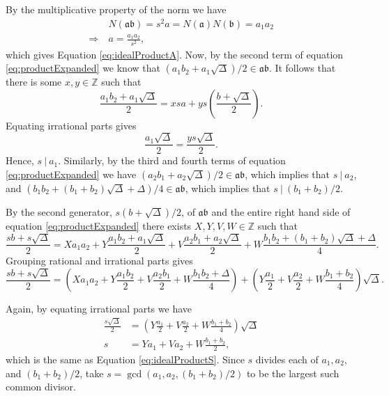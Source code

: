 \documentclass{ucalgthes1}
\theoremstyle{definition}
\newcommand{\ZZ}{\mathbb{Z}}
\begin{document}
\noindent
By the multiplicative property of the norm we have
\begin{align*}
	& N(\mathfrak{a}\mathfrak{b}) = s^2a = N(\mathfrak{a})N(\mathfrak{b}) = a_1 a_2 \\
	\Rightarrow~ & a = \frac{a_1a_2}{s^2},
\end{align*}
which gives Equation \ref{eq:idealProductA}. Now, by the second term of equation \eqref{eq:productExpanded} we know that $(a_1b_2 + a_1\sqrt{\Delta})/2 \in \mathfrak{a}\mathfrak{b}$.  It follows that there is some $x,y \in \ZZ$ such that
\[
	\frac{a_1b_2 + a_1\sqrt{\Delta}}{2} = xsa + ys\left(\frac{b+\sqrt{\Delta}}{2}\right).
\]
Equating irrational parts gives
\begin{equation*}
	\frac{a_1\sqrt{\Delta}}{2} = \frac{ys\sqrt{\Delta}}{2}.
\end{equation*}
\noindent
Hence, $s ~|~ a_1$.  Similarly, by the third and fourth terms of equation \eqref{eq:productExpanded} we have $(a_2b_1+a_2\sqrt{\Delta})/2 \in \mathfrak{a}\mathfrak{b}$, which implies that $s~|~a_2$, and $(b_1b_2 + (b_1+b_2)\sqrt{\Delta} + \Delta)/4 \in \mathfrak{a}\mathfrak{b}$, which implies that $s~|~(b_1+b_2)/2$. 

By the second generator, $s(b+\sqrt\Delta)/2$, of $\mathfrak{a}\mathfrak{b}$ and the entire right hand side of equation \eqref{eq:productExpanded} there exists $X, Y, V, W \in \ZZ$ such that
\[
\frac{sb+s\sqrt\Delta}{2} = Xa_1a_2 + Y\frac{a_1b_2+a_1\sqrt\Delta}{2} + V\frac{a_2b_1 + a_2\sqrt{\Delta}}{2} + W\frac{b_1b_2 + (b_1+b_2)\sqrt{\Delta} + \Delta}{4}.
\]
Grouping rational and irrational parts gives
\begin{equation}
\label{eq:productSecond}
\frac{sb+s\sqrt\Delta}{2} = \left( Xa_1a_2 + Y\frac{a_1b_2}{2} + V\frac{a_2b_1}{2} + W\frac{b_1b_2 + \Delta}{4} \right) + \left(Y\frac{a_1}{2} + V\frac{a_2}{2} + W\frac{b_1+b_2}{4}\right)\sqrt\Delta. 
\end{equation}

\noindent
Again, by equating irrational parts we have
\begin{align}
	\frac{s\sqrt\Delta}{2} & = \left(Y\frac{a_1}{2} + V\frac{a_2}{2} + W\frac{b_1+b_2}{4}\right)\sqrt\Delta \nonumber \\
	s & = Ya_1 + Va_2 + W\frac{b_1+b_2}{2}, \label{eq:sAsGCD}
\end{align}
which is the same as Equation \ref{eq:idealProductS}.  Since $s$ divides each of $a_1, a_2,$ and $(b_1+b_2)/2$, take $s = \gcd(a_1, a_2, (b_1+b_2)/2)$ to be the largest such common divisor.
\end{document}
